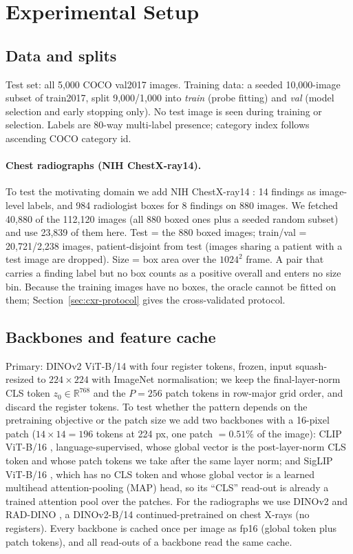 \documentclass[10pt,letterpaper,twocolumn]{article}
\begin{document}
\section{Experimental Setup}
\label{sec:setup}

\subsection{Data and splits}
Test set: all 5,000 COCO val2017 images. Training data: a seeded 10,000-image subset of
train2017, split 9,000/1,000 into \emph{train} (probe fitting) and \emph{val} (model selection
and early stopping only). No test image is seen during training or selection. Labels are
80-way multi-label presence; category index follows ascending COCO category id.

\paragraph{Chest radiographs (NIH ChestX-ray14).}
To test the motivating domain we add NIH ChestX-ray14 \citep{wang2017chestxray8}: 14 findings as
image-level labels, and 984 radiologist boxes for 8 findings on 880 images. We fetched 40,880
of the 112,120 images (all 880 boxed ones plus a seeded random subset) and use 23,839 of them
here. Test = the 880 boxed images; train/val = 20,721/2,238 images, patient-disjoint from test
(images sharing a patient with a test image are dropped). Size = box area over the $1024^2$
frame. A pair that carries a finding label but no box counts as a positive overall and enters
no size bin. Because the training images have no boxes, the oracle cannot be fitted on them;
Section~\ref{sec:cxr-protocol} gives the cross-validated protocol.
\subsection{Backbones and feature cache}
\label{sec:backbones}
Primary: DINOv2 ViT-B/14 with four register tokens, frozen, input squash-resized to
$224\times224$ with ImageNet normalisation; we keep the final-layer-norm CLS token
$z_0\in\mathbb{R}^{768}$ and the $P=256$ patch tokens in row-major grid order, and discard the
register tokens. To test whether the pattern depends on the pretraining objective or the
patch size we add two backbones with a 16-pixel patch ($14\times14=196$ tokens at 224 px, one
patch $=0.51\%$ of the image): CLIP ViT-B/16 \citep{radford2021clip}, language-supervised,
whose global vector is the post-layer-norm CLS token and whose patch tokens we take after the
same layer norm; and SigLIP ViT-B/16 \citep{zhai2023siglip}, which has no CLS token and whose
global vector is a learned multihead attention-pooling (MAP) head, so its ``CLS'' read-out is
already a trained attention pool over the patches. For the radiographs we use DINOv2 and
RAD-DINO \citep{perezgarcia2025raddino}, a DINOv2-B/14 continued-pretrained on chest X-rays
(no registers). Every backbone is cached once per image as fp16 (global token plus patch
tokens), and all read-outs of a backbone read the same cache.
\end{document}

